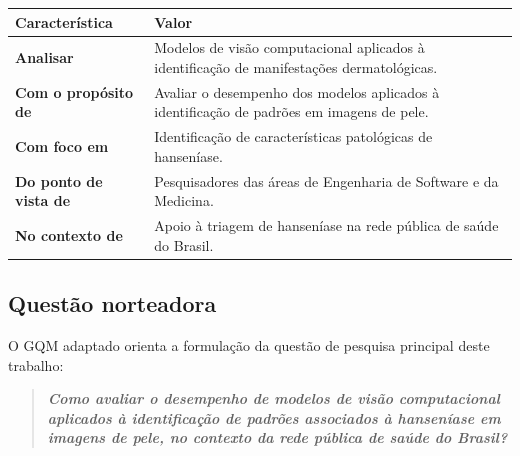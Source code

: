 	{\def\LTcaptype{none} %
		\begin{longtable}[]{|>{\raggedright\arraybackslash}p{}|>{\raggedright\arraybackslash}p{}|}
			\hline
			\begin{minipage}[b]{\linewidth}\raggedright
				Característica
			\end{minipage} & \begin{minipage}[b]{\linewidth}\raggedright
				                 Valor
			                 \end{minipage}                                   \\ \hline
			\endhead

			\endlastfoot
			\textbf{Analisar}                           & Modelos de visão computacional aplicados à
			identificação de manifestações dermatológicas.                                                \\ \hline
			\textbf{Com o propósito de}                 & Avaliar o desempenho dos modelos aplicados
			à identificação de padrões em imagens de pele.                                                \\ \hline
			\textbf{Com foco em}                        & Identificação de características patológicas de
			hanseníase.                                                                                   \\ \hline
			\textbf{Do ponto de vista de}               & Pesquisadores das áreas de Engenharia de
			Software e da Medicina.                                                                       \\ \hline
			\textbf{No contexto de}                     & Apoio à triagem de hanseníase na rede pública
			de saúde do Brasil.                                                                           \\ \hline
		\end{longtable}
	}

\subsection{Questão norteadora}\label{subsec:questao-norteadora}
O GQM adaptado orienta a formulação da questão de pesquisa principal deste trabalho:

\begin{quote}
	\textbf{\textit{Como avaliar o desempenho de modelos de visão computacional aplicados à
			identificação de padrões associados à hanseníase em imagens de pele, no
			contexto da rede pública de saúde do Brasil?}}
\end{quote}

